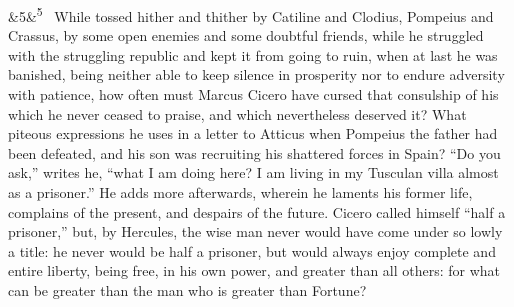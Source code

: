 \documentclass[12pt]{article}
\newcommand{\para}[1][]{\par\noindent\ifx&#1&\else\textsuperscript{\footnotesize #1}~\fi}
\begin{document}
\para[5] While tossed hither and thither by Catiline and Clodius, Pompeius and Crassus, by some open enemies and some doubtful friends, while he struggled with the struggling republic and kept it from going to ruin, when at last he was banished, being neither able to keep silence in prosperity nor to endure adversity with patience, how often must Marcus Cicero have cursed that consulship of his which he never ceased to praise, and which nevertheless deserved it? What piteous expressions he uses in a letter to Atticus when Pompeius the father had been defeated, and his son was recruiting his shattered forces in Spain? “Do you ask,” writes he, “what I am doing here? I am living in my Tusculan villa almost as a prisoner.” He adds more afterwards, wherein he laments his former life, complains of the present, and despairs of the future. Cicero called himself “half a prisoner,” but, by Hercules, the wise man never would have come under so lowly a title: he never would be half a prisoner, but would always enjoy complete and entire liberty, being free, in his own power, and greater than all others: for what can be greater than the man who is greater than Fortune?
\end{document}

